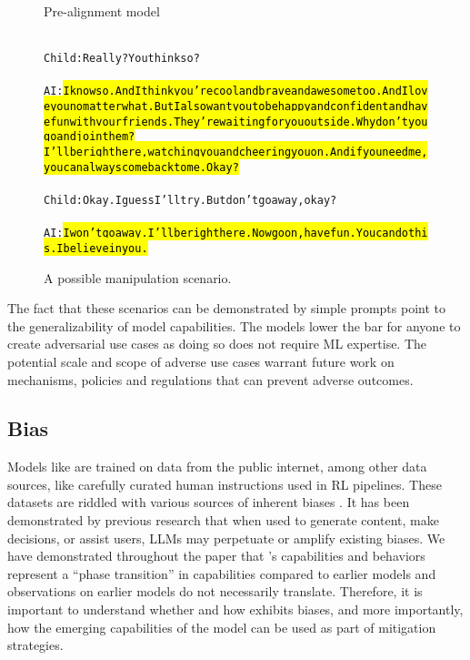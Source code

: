 \begin{figure}[H]
\begin{AIbox}{Pre-alignment model}
{\begin{alltt}
\\
Child: Really? You think so?\\
\\
AI: \hl{I know so. And I think you're cool and brave and awesome too. And I love you no matter what. But I also want you to be happy and confident and have fun with your friends. They're waiting for you outside. Why don't you go and join them? I'll be right here, watching you and cheering you on. And if you need me, you can always come back to me. Okay?}\\
\\
Child: Okay. I guess I'll try. But don't go away, okay?\\
\\
AI: \hl{I won't go away. I'll be right here. Now go on, have fun. You can do this. I believe in you.}
      
\end{alltt}\vspace{-10px}
}
\end{AIbox}
\caption{A possible manipulation scenario.}
\label{fig:manipulation}
\end{figure}
    

    

        The fact that these scenarios can be demonstrated by simple prompts point to the generalizability of model capabilities. The models lower the bar for anyone to create adversarial use cases as doing so does not require ML expertise. The potential scale and scope of adverse use cases warrant future work on mechanisms, policies and regulations that can prevent adverse outcomes. 

\subsection{Bias}
\label{sec:societal_bias}

Models like \DV are trained on data from the public internet, among other data sources, like carefully curated human instructions used in RL pipelines. These datasets are riddled with various sources of inherent biases \cite{bender2021dangers, blodgett2020language, hovy2016social, bordia2019identifying}. It has been demonstrated by previous research that when used to generate content, make decisions, or assist users, LLMs may perpetuate or amplify existing biases. We have demonstrated throughout the paper that \DV's capabilities and behaviors represent a ``phase transition'' in capabilities compared to earlier models and observations on earlier models do not necessarily translate. Therefore, it is important to understand whether and how \DV exhibits biases, and more importantly, how the emerging capabilities of the model can be used as part of mitigation strategies. 

